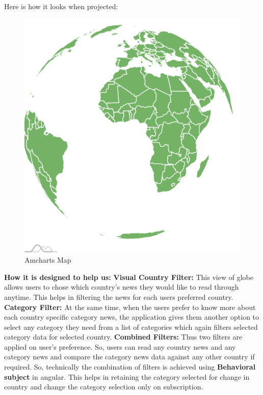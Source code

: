 \begin{enumerate}
      Here is how it looks when projected:
       \begin{figure}[h!]
      \begin{center}
         \includegraphics[scale=1]{images/globe.PNG}
          \centering \caption{Amcharts Map}
      \end{center}
      \end{figure}
       \textbf{How it is designed to help us:}\newline
     \textbf{ Visual Country Filter:}
      This view of globe allows users to chose which country's news they would like to read through anytime. This helps in filtering the news for each users preferred country.\newline
      \textbf{Category Filter: }
      At the same time, when the users prefer to know more about each country specific category news, the application gives them another option to select any category they need from a list of categories which again filters selected category data for selected country.\newline
         \textbf{ Combined Filters:}
      Thus two filters are applied on user's preference.
      So, users can read any country news and any category news and compare the category news data against any other country if required.\newline
       So, technically the combination of filters is achieved using \textbf{Behavioral subject} in angular. This helps in retaining the category selected for change in country and change the category selection only on subscription.\newline

\end{enumerate}
